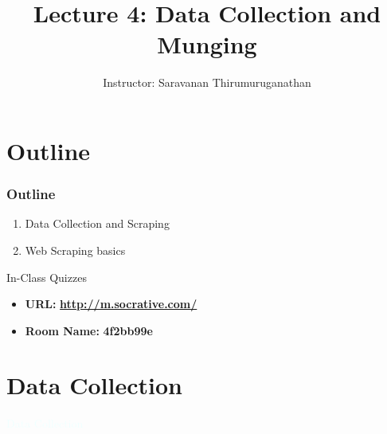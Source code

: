 \documentclass{beamer}
\title[Saravanan Thirumuruganathan] 
{Lecture 4: Data Collection and Munging}
\author[CSE 5334] 
{Instructor: Saravanan Thirumuruganathan}
\date[]
\newcommand{\thblue}[1]{{\Huge {\textcolor{azure}{#1}}}}
\begin{document}
\begin{frame}
  \titlepage
\end{frame}


\section{Outline}

\begin{frame}
\frametitle {Outline}
\begin{enumerate}
\item Data Collection and Scraping
\item Web Scraping basics
\end{enumerate}
\end{frame}


\begin{frame}{In-Class Quizzes}
\begin{itemize}
\item {\Large {\bf URL:}} {\LARGE \bf \url{http://m.socrative.com/}} 
\item {\Large {\bf Room Name:} {\LARGE \bf 4f2bb99e}}
\end{itemize}
\end{frame}


\section{Data Collection}
\begin{frame}{} 
    \begin{center}
        \thblue{Data Collection}
    \end{center}
\end{frame}
\end{document}
